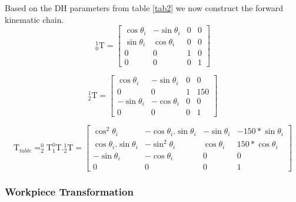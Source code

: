 Based on the DH parameters from table \ref{tab2} we now construct the forward kinematic chain. 
\begin{equation}
\label{eq20}
_{0}^{1}\textrm{T} = \begin{bmatrix} \cos\theta_{i} & -\sin \theta_{i} & 0 & 0\\ \sin \theta_{i} & \cos \theta_{i} & 0 & 0\\ 0 & 0 & 1 & 0\\ 0 & 0 & 0 & 1 \end{bmatrix}
\end{equation}

\begin{equation}
\label{eq21}
_{2}^{1}\textrm{T} = \begin{bmatrix} \cos\theta_{i} & -\sin \theta_{i} & 0 & 0\\ 0 & 0 & 1 & 150\\ -\sin \theta_{i} & -\cos\theta_{i} & 0 & 0\\ 0 & 0 & 0 & 1 \end{bmatrix}
\end{equation}

\begin{equation}
\label{eq22}
\textrm{T}_{table} =_{2}^{0}\textrm{T}_{1}^{0}\textrm{T}._{2}^{1}\textrm{T} = \begin{bmatrix} \cos^{2}\theta_{i}& -\cos\theta_{i}.\sin\theta_{i} & -\sin\theta_{i} & -150*\sin\theta_{i}\\ \cos\theta_{i}.\sin\theta_{i} & -\sin^{2}\theta_{i} & \cos\theta_{i} & 150*\cos\theta_{i}\\ -\sin\theta_{i} & -\cos\theta_{i}& 0 & 0\\ 0& 0& 0& 1\end{bmatrix}
\end{equation}

\subsubsection{Workpiece Transformation}

